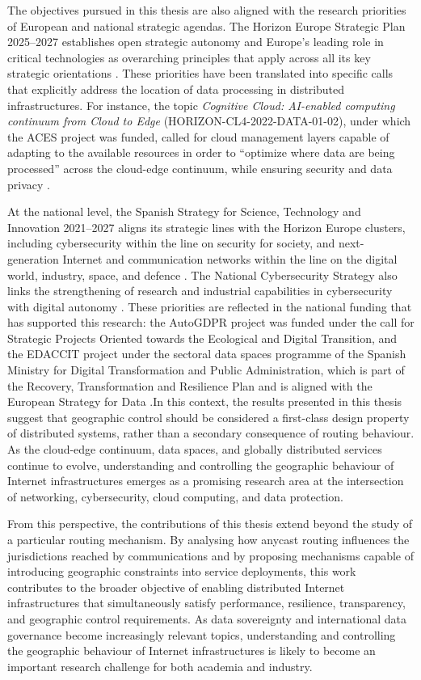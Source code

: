 The objectives pursued in this thesis are also aligned with the research priorities of European and national strategic agendas. The Horizon Europe Strategic Plan 2025--2027 establishes open strategic autonomy and Europe's leading role in critical technologies as overarching principles that apply across all its key strategic orientations \cite{StrategicCommission}. These priorities have been translated into specific calls that explicitly address the location of data processing in distributed infrastructures. For instance, the topic \textit{Cognitive Cloud: AI-enabled computing continuum from Cloud to Edge} (HORIZON-CL4-2022-DATA-01-02), under which the ACES project was funded, called for cloud management layers capable of adapting to the available resources in order to ``optimize where data are being processed'' across the cloud-edge continuum, while ensuring security and data privacy \cite{CognitiveCommission}.

At the national level, the Spanish Strategy for Science, Technology and Innovation 2021--2027 aligns its strategic lines with the Horizon Europe clusters, including cybersecurity within the line on security for society, and next-generation Internet and communication networks within the line on the digital world, industry, space, and defence \cite{Estrategia2021-2027}. The National Cybersecurity Strategy also links the strengthening of research and industrial capabilities in cybersecurity with digital autonomy \cite{BOE-A-2019-6347Nacional.}. These priorities are reflected in the national funding that has supported this research: the AutoGDPR project was funded under the call for Strategic Projects Oriented towards the Ecological and Digital Transition, and the EDACCIT project under the sectoral data spaces programme of the Spanish Ministry for Digital Transformation and Public Administration, which is part of the Recovery, Transformation and Resilience Plan and is aligned with the European Strategy for Data \cite{PortalSectoriales}.In this context, the results presented in this thesis suggest that geographic control should be considered a first-class design property of distributed systems, rather than a secondary consequence of routing behaviour. As the cloud-edge continuum, data spaces, and globally distributed services continue to evolve, understanding and controlling the geographic behaviour of Internet infrastructures emerges as a promising research area at the intersection of networking, cybersecurity, cloud computing, and data protection.

From this perspective, the contributions of this thesis extend beyond the study of a particular routing mechanism. By analysing how anycast routing influences the jurisdictions reached by communications and by proposing mechanisms capable of introducing geographic constraints into service deployments, this work contributes to the broader objective of enabling distributed Internet infrastructures that simultaneously satisfy performance, resilience, transparency, and geographic control requirements. As data sovereignty and international data governance become increasingly relevant topics, understanding and controlling the geographic behaviour of Internet infrastructures is likely to become an important research challenge for both academia and industry.

